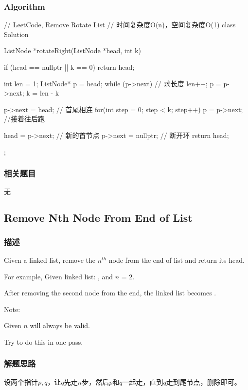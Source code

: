 \subsubsection{Algorithm}
\begin{Code}
	// LeetCode, Remove Rotate List
	// 时间复杂度O(n)，空间复杂度O(1)
	class Solution {
		ListNode *rotateRight(ListNode *head, int k) {
			if (head == nullptr || k == 0) return head;
			
			int len = 1;
			ListNode* p = head;
			while (p->next) { // 求长度
				len++;
				p = p->next;
			}
			k = len - k %
			
			p->next = head; // 首尾相连
			for(int step = 0; step < k; step++) 
				p = p->next;  //接着往后跑
			
			head = p->next; // 新的首节点
			p->next = nullptr; // 断开环
			return head;
		}
	};
\end{Code}


\subsubsection{相关题目}

\begindot
\item 无
\myenddot


\subsection{Remove Nth Node From End of List}
\label{sec:remove-nth-node-from-end-of-list}


\subsubsection{描述}
Given a linked list, remove the $n^{th}$ node from the end of list and return 
its head.

For example, Given linked list: , and $n$ = 2.

After removing the second node from the end, the linked list becomes 
.

Note:
\begindot
\item Given $n$ will always be valid.
\item Try to do this in one pass.
\myenddot


\subsubsection{解题思路}
设两个指针$p,q$，让$q$先走$n$步，然后$p$和$q$一起走，直到$q$走到尾节点，删除即可。


